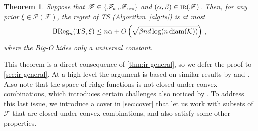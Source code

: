 \documentclass[letter, 12pt]{report}
\newcommand{\pr}{\text{\tiny\texttt{r}}}
\newcommand{\pb}{\text{\tiny\texttt{b}}}
\newcommand{\pl}{\text{\tiny\texttt{l}}}
\renewcommand{\pm}{\text{\tiny\texttt{m}}}
\newcommand{\BReg}{\textrm{BReg}}
\newcommand{\cK}{\mathcal K}
\newcommand{\sF}{\mathscr F}
\newcommand{\sP}{\mathscr P}
\newcommand{\diam}{\operatorname{diam}}
\newcommand{\1}{\mathbf{1}}
\newcommand{\IR}{\operatorname{\textsc{ir}}}
\newcommand{\ts}{\textsc{TS}\xspace}
\theoremstyle{plain}
\newtheorem{theorem}{Theorem}
\theoremstyle{definition}
\theoremstyle{remark}
\begin{document}
\begin{theorem}\label{thm:ts-ir-regret}
    Suppose that $\sF \in \{\sF_{\pb\pl}, \sF_{\pb\pl\pr\pm}\}$ and $(\alpha, \beta) \in \IR(\sF)$.
    Then, for any prior $\xi \in \sP(\sF)$, the regret of \ts{} (Algorithm~\ref{alg:ts}) is at most
    \begin{align*}
        \BReg_n(\ts, \xi) \leq n \alpha + O\left(\sqrt{\beta n d \log(n \diam(\cK))}\right) \,,
    \end{align*}
    where the Big-O hides only a universal constant.
\end{theorem}
This theorem is a direct consequence of \cref{thm:ir-general},
so we defer the proof to \cref{sec:ir-general}.
At a high level the argument is based on similar results by \cite{BDKP15} and \cite{BE18}.
Also note that the space of ridge functions is not closed under convex combinations, which introduces certain challenges also
noticed by \cite{lattimore2021minimax}.
To address this last issue, we introduce a cover in \cref{sec:cover} that let us
work with subsets of $\sF$ that are closed under convex combinations,
and also satisfy some other properties.
\end{document}
